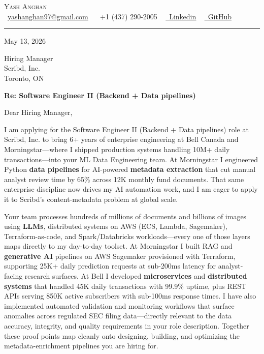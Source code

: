 \documentclass[11pt,letterpaper]{article}
\begin{document}
\begin{center}
{\Huge \scshape Yash Anghan} \\ \vspace{2pt}
\small \raisebox{-0.1\height}\faEnvelope\ \href{mailto:yashanghan97@gmail.com}{yashanghan97@gmail.com} ~
\raisebox{-0.1\height}\faPhone\ +1 (437) 290-2005 ~
\href{https://www.linkedin.com/in/yash-aiautomation/}{\raisebox{-0.2\height}\faLinkedin\ \underline{Linkedin}} ~
\href{https://github.com/yash-ai-automation}{\raisebox{-0.2\height}\faGithub\ \underline{GitHub}} ~
\vspace{-8pt}
\end{center}

\vspace{-17pt}
\noindent\rule{\textwidth}{0.4pt}
\vspace{4pt}

May 13, 2026

Hiring Manager \\
Scribd, Inc. \\
Toronto, ON

\textbf{Re: Software Engineer II (Backend + Data pipelines)}

Dear Hiring Manager,

I am applying for the Software Engineer II (Backend + Data pipelines) role at Scribd, Inc. to bring 6+ years of enterprise engineering at Bell Canada and Morningstar---where I shipped production systems handling 10M+ daily transactions---into your ML Data Engineering team. At Morningstar I engineered Python \textbf{data pipelines} for AI-powered \textbf{metadata extraction} that cut manual analyst review time by 65\% across 12K monthly fund documents. That same enterprise discipline now drives my AI automation work, and I am eager to apply it to Scribd's content-metadata problem at global scale.

Your team processes hundreds of millions of documents and billions of images using \textbf{LLMs}, distributed systems on AWS (ECS, Lambda, Sagemaker), Terraform-as-code, and Spark/Databricks workloads---every one of those layers maps directly to my day-to-day toolset. At Morningstar I built RAG and \textbf{generative AI} pipelines on AWS Sagemaker provisioned with Terraform, supporting 25K+ daily prediction requests at sub-200ms latency for analyst-facing research surfaces. At Bell I developed \textbf{microservices} and \textbf{distributed systems} that handled 45K daily transactions with 99.9\% uptime, plus REST APIs serving 850K active subscribers with sub-100ms response times. I have also implemented automated validation and monitoring workflows that surface anomalies across regulated SEC filing data---directly relevant to the data accuracy, integrity, and quality requirements in your role description. Together these proof points map cleanly onto designing, building, and optimizing the metadata-enrichment pipelines you are hiring for.
\end{document}
